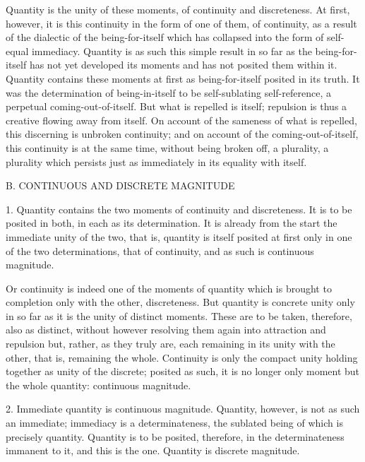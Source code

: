Quantity is the unity of these moments,
of continuity and discreteness.
At first, however, it is this continuity
in the form of one of them, of continuity,
as a result of the dialectic of the being-for-itself
which has collapsed into the form of self-equal immediacy.
Quantity is as such this simple result
in so far as the being-for-itself has
not yet developed its moments
and has not posited them within it.
Quantity contains these moments at first
as being-for-itself posited in its truth.
It was the determination of being-in-itself
to be self-sublating self-reference,
a perpetual coming-out-of-itself.
But what is repelled is itself;
repulsion is thus a creative flowing away from itself.
On account of the sameness of what is repelled,
this discerning is unbroken continuity;
and on account of the coming-out-of-itself,
this continuity is at the same time,
without being broken off, a plurality,
a plurality which persists just as
immediately in its equality with itself.

B. CONTINUOUS AND DISCRETE MAGNITUDE

1. Quantity contains the two moments of continuity and discreteness.
It is to be posited in both, in each as its determination.
It is already from the start the immediate unity of the two,
that is, quantity is itself posited at first
only in one of the two determinations, that of continuity,
and as such is continuous magnitude.

Or continuity is indeed one of the moments of quantity
which is brought to completion only with the other, discreteness.
But quantity is concrete unity only in so far as
it is the unity of distinct moments.
These are to be taken, therefore, also as distinct,
without however resolving them again
into attraction and repulsion
but, rather, as they truly are,
each remaining in its unity with the other,
that is, remaining the whole.
Continuity is only the compact unity
holding together as unity of the discrete;
posited as such, it is no longer only moment
but the whole quantity: continuous magnitude.

2. Immediate quantity is continuous magnitude.
Quantity, however, is not as such an immediate;
immediacy is a determinateness,
the sublated being of which is precisely quantity.
Quantity is to be posited, therefore,
in the determinateness immanent to it,
and this is the one.
Quantity is discrete magnitude.

